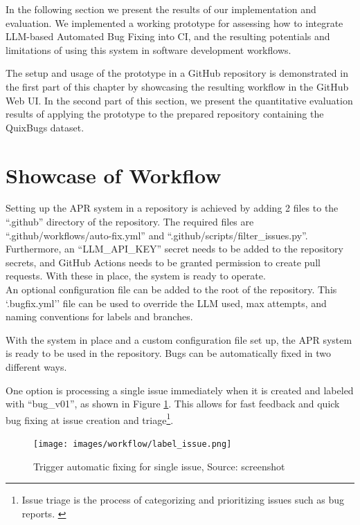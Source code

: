 In the following section we present the results of our implementation and evaluation. We implemented a working prototype for assessing how to integrate LLM-based Automated Bug Fixing into \ac{CI}, and the resulting potentials and limitations of using this system in software development workflows.

The setup and usage of the prototype in a GitHub repository is demonstrated in the first part of this chapter by showcasing the resulting workflow in the GitHub Web \ac{UI}.
In the second part of this section, we present the quantitative evaluation results of applying the prototype to the prepared repository containing the QuixBugs dataset.

\section{Showcase of Workflow} \label{section:showcase}

Setting up the APR system in a repository is achieved by adding 2 files to the ``.github'' directory of the repository. The required files are ``.github/workflows/auto-fix.yml'' and ``.github/scripts/filter\_issues.py''. Furthermore, an ``LLM\_API\_KEY'' secret needs to be added to the repository secrets, and GitHub Actions needs to be granted permission to create pull requests. With these in place, the system is ready to operate.\\
An optional configuration file can be added to the root of the repository. This `.bugfix.yml'' file can be used to override the \ac{LLM} used, max attempts, and naming conventions for labels and branches.

With the system in place and a custom configuration file set up, the APR system is ready to be used in the repository. Bugs can be automatically fixed in two different ways.

One option is processing a single issue immediately when it is created and labeled with ``bug\_v01'', as shown in Figure \ref{fig:issue-trigger}. This allows for fast feedback and quick bug fixing at issue creation and triage\footnote{Issue triage is the process of categorizing and prioritizing issues such as bug reports. \cite{IssuesTriaging}}.

\begin{figure}[H]
    \centering
    \texttt{[image: images/workflow/label\_issue.png]}
    \caption{Trigger automatic fixing for single issue, Source: screenshot}
    \label{fig:issue-trigger}
\end{figure}

